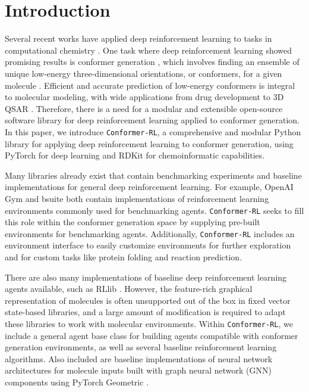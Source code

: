 \documentclass[twoside,11pt]{article}
\newcommand{\code}[1]{\texttt{#1}}
\newcommand{\titleofpaper}{Conformer-RL}
\newcommand{\genComment}[2]{\ifnum\comments=1{\color{#1}{\textsf{\footnotesize #2}}}\fi}
\newcommand{\tarun}[1] {\genComment{blue}{[TG: #1]}}
\newcommand{\runxuan}[1]{\genComment{pink}{[RJ:#1]}}
\begin{document}
\section{Introduction}
Several recent works have applied deep reinforcement learning to tasks in computational chemistry \citep{li2018foldingzero,zhou2017reactions,simm2020moldesign}. One task where deep reinforcement learning showed promising results is conformer generation \citep{gogineni2020torsionnet}, which involves finding an ensemble of unique low-energy three-dimensional orientations, or conformers, for a given molecule \citep{ebejer2020confgen}. Efficient and accurate prediction of low-energy conformers is integral to molecular modeling, with wide applications from drug development to 3D QSAR \citep{cole2018confgen}. Therefore, there is a need for a modular and extensible open-source software library for deep reinforcement learning applied to conformer generation.
In this paper, we introduce \code{\titleofpaper}, a comprehensive and modular Python library for applying deep reinforcement learning to conformer generation, using PyTorch \citep{torch} for deep learning and RDKit \citep{Landrum2016rdkit} for chemoinformatic capabilities.

Many libraries already exist that contain benchmarking experiments and baseline implementations for general deep reinforcement learning. For example, OpenAI Gym \citep{brockman2016gym} and bsuite \citep{osband2020bsuite} both contain implementations of reinforcement learning environments commonly used for benchmarking agents. \code{\titleofpaper} seeks to fill this role within the conformer generation space by supplying pre-built environments for benchmarking agents. Additionally, \code{\titleofpaper} includes an environment interface to easily customize environments for further exploration and for custom tasks like protein folding and reaction prediction.

There are also many implementations of baseline deep reinforcement learning agents available, such as RLlib \citep{liang2018rllib}. However, the feature-rich graphical representation of molecules is often unsupported out of the box in fixed vector state-based libraries, and a large amount of modification is required to adapt these libraries to work with molecular environments. Within \code{\titleofpaper}, we include a general agent base class for building agents compatible with conformer generation environments, as well as several baseline reinforcement learning algorithms. Also included are baseline implementations of neural network architectures for molecule inputs built with graph neural network (GNN) components using PyTorch Geometric \citep{fey2019geometric}.
\end{document}
